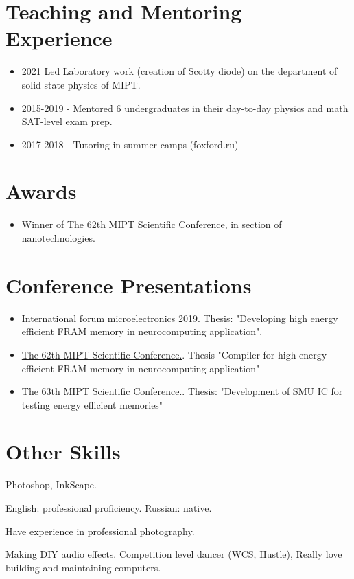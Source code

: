 \documentclass{article}
\begin{document}
\section{Teaching and Mentoring Experience }
\begin{itemize}
\item 2021 Led Laboratory work (creation of Scotty diode) on the department of solid state physics of MIPT. 
\item 2015-2019 - Mentored 6 undergraduates in their day-to-day physics and math SAT-level exam prep.
\item 2017-2018 - Tutoring in summer camps (foxford.ru)
\end{itemize}
 
\section{Awards}
\begin{itemize}
\item Winner of The 62th MIPT Scientific Conference, in section of nanotechnologies.
\end{itemize}
 
\section{Conference Presentations }
 
\begin{itemize}
\item \href{https://microelectronica.pro/}{International forum microelectronics 2019}. Thesis: "Developing high energy efficient FRAM memory in neurocomputing application".
\item  \href{https://conf62.mipt.ru/}{The 62th MIPT Scientific Conference.}. Thesis "Compiler for high energy efficient FRAM memory in neurocomputing application"
\item \href{https://mipt.ru/science/5top100/education/courseproposal/%D0%A4%D0%AD%D0%A4%D0%9C.pdf}{The 63th MIPT Scientific Conference.}. Thesis: "Development of SMU IC for testing energy efficient memories"
\end{itemize}
 
 
 
 
\section{Other Skills}
\begin{description}[widest=Langauges]
\item[Software]  Photoshop, InkScape.
\item[Languages] English: professional proficiency.  Russian: native.
\item[Photography] Have experience in professional photography.
\item[Hobbies] Making DIY audio effects. Competition level dancer (WCS, Hustle), Really love building and maintaining computers.
\end{description}
 
\end{document}
